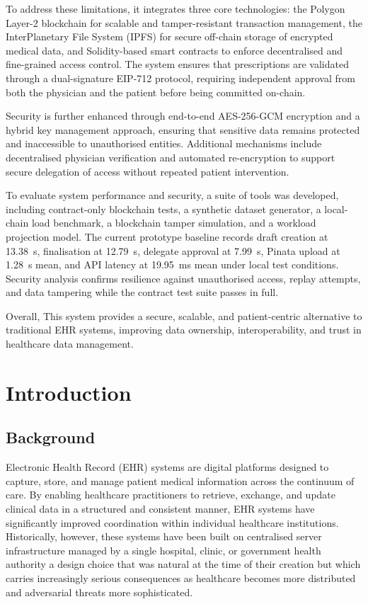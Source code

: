 \documentclass[12pt,a4wide]{report}
\begin{document}
To address these limitations, it integrates three core technologies: the Polygon Layer-2 blockchain for scalable and tamper-resistant transaction management, the InterPlanetary File System (IPFS) for secure off-chain storage of encrypted medical data, and Solidity-based smart contracts to enforce decentralised and fine-grained access control. The system ensures that prescriptions are validated through a dual-signature EIP-712 protocol, requiring independent approval from both the physician and the patient before being committed on-chain.

Security is further enhanced through end-to-end AES-256-GCM encryption and a hybrid key management approach, ensuring that sensitive data remains protected and inaccessible to unauthorised entities. Additional mechanisms include decentralised physician verification and automated re-encryption to support secure delegation of access without repeated patient intervention.

To evaluate system performance and security, a suite of tools was developed, including contract-only blockchain tests, a synthetic dataset generator, a local-chain load benchmark, a blockchain tamper simulation, and a workload projection model. The current prototype baseline records draft creation at 13.38~s, finalisation at 12.79~s, delegate approval at 7.99~s, Pinata upload at 1.28~s mean, and API latency at 19.95~ms mean under local test conditions. Security analysis confirms resilience against unauthorised access, replay attempts, and data tampering while the contract test suite passes in full.

Overall, This system provides a secure, scalable, and patient-centric alternative to traditional EHR systems, improving data ownership, interoperability, and trust in healthcare data management.

\tableofcontents
\listoffigures
\listoftables

\chapter{Introduction}

\section{Background}

Electronic Health Record (EHR) systems are digital platforms designed to capture,
store, and manage patient medical information across the continuum of care. By
enabling healthcare practitioners to retrieve, exchange, and update clinical data
in a structured and consistent manner, EHR systems have significantly improved
coordination within individual healthcare institutions. Historically, however,
these systems have been built on centralised server infrastructure managed by
a single hospital, clinic, or government health authority a design choice that
was natural at the time of their creation but which carries increasingly serious
consequences as healthcare becomes more distributed and adversarial threats more
sophisticated.
\end{document}
